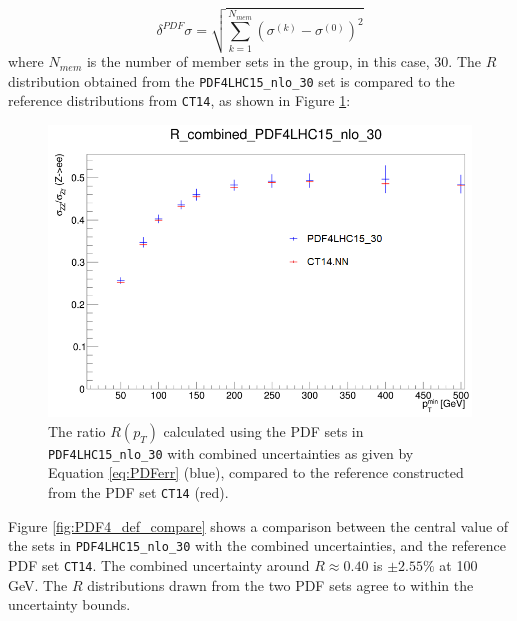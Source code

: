\documentclass[11pt,a4paper]{report}
\begin{document}
\begin{equation}\label{eq:PDFerr}
	\delta^{PDF}\sigma = \sqrt{\sum^{N_{mem}}_{k=1} (\sigma^{(k)} - \sigma^{(0)})^2}
\end{equation}
where $N_{mem}$ is the number of member sets in the group, in this case, 30. The $R$ distribution obtained from the \texttt{PDF4LHC15\_nlo\_30} set is compared to the reference distributions from \texttt{CT14}, as shown in Figure \ref{pdfcompare}:
\begin{figure}[H]
\centering
	\includegraphics[width = 0.55\linewidth]{PDF4_CT14_comp.png}
	\caption{The ratio $R(p_T)$ calculated using the PDF sets in \texttt{PDF4LHC15\_nlo\_30} with combined uncertainties as given by Equation \ref{eq:PDFerr} (blue), compared to the reference constructed from the PDF set \texttt{CT14} (red).}
	\label{fig:PDF4_def_compare}
	\label{pdfcompare}
\end{figure}
\noindent Figure \ref{fig:PDF4_def_compare} shows a comparison between the central value of the sets in \texttt{PDF4LHC15\_nlo\_30} with the combined uncertainties, and the reference PDF set \texttt{CT14}. The combined uncertainty around $R \approx 0.40$ is $\pm 2.55\%$ at 100 GeV. The $R$ distributions drawn from the two PDF sets agree to within the uncertainty bounds.

\end{document}
